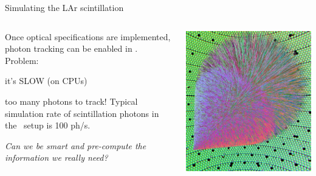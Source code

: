 \documentclass[10pt,aspectratio=169]{beamer}
\begin{document}
\begin{frame}{Simulating the LAr scintillation}
  \begin{columns}
    \begin{column}{0.6\textwidth}\setlength{\parskip}{10pt}%
    Once optical specifications are implemented, photon tracking can be enabled
    in \geant. Problem:
    \begin{center}
      \alert{it's SLOW} {\small(on CPUs)}
    \end{center}
    too many photons to track! Typical simulation rate of scintillation photons
    in the \gerda\ setup is \alert{100 ph/s}.

    \emph{Can we be smart and pre-compute the information we really need?}
    \end{column}
    \begin{column}{0.4\textwidth}
      \begin{center}
        \includegraphics[width=\columnwidth]{opticks-shower.png}
      \end{center}
    \end{column}
  \end{columns}
\end{frame}
\end{document}
